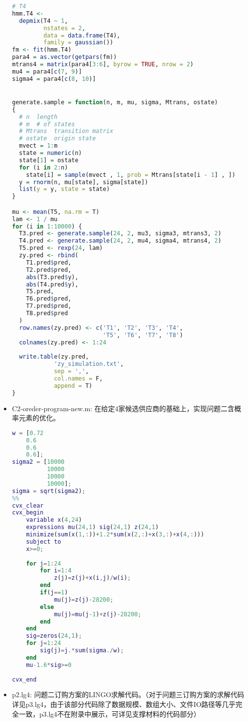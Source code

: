 \documentclass{my_paper}
\begin{document}
\begin{itemize}
\begin{lstlisting}[language=R]
# T4
hmm.T4 <-
  depmix(T4 ~ 1,
         nstates = 2,
         data = data.frame(T4),
         family = gaussian())
fm <- fit(hmm.T4)
para4 = as.vector(getpars(fm))
mtrans4 = matrix(para4[3:6], byrow = TRUE, nrow = 2)
mu4 = para4[c(7, 9)]
sigma4 = para4[c(8, 10)]


generate.sample = function(n, m, mu, sigma, Mtrans, ostate)
{
  # n  length
  # m  # of states
  # Mtrans  transition matrix
  # ostate  origin state
  mvect = 1:m
  state = numeric(n)
  state[1] = ostate
  for (i in 2:n)
    state[i] = sample(mvect , 1, prob = Mtrans[state[i - 1] , ])
  y = rnorm(n, mu[state], sigma[state])
  list(y = y, state = state)
}

mu <- mean(T5, na.rm = T)
lam <- 1 / mu
for (i in 1:10000) {
  T3.pred <- generate.sample(24, 2, mu3, sigma3, mtrans3, 2)
  T4.pred <- generate.sample(24, 2, mu4, sigma4, mtrans4, 2)
  T5.pred <- rexp(24, lam)
  zy.pred <- rbind(
    T1.pred$pred,
    T2.pred$pred,
    abs(T3.pred$y),
    abs(T4.pred$y),
    T5.pred,
    T6.pred$pred,
    T7.pred$pred,
    T8.pred$pred
  )
  row.names(zy.pred) <- c('T1', 'T2', 'T3', 'T4',
                          'T5', 'T6', 'T7', 'T8')
  colnames(zy.pred) <- 1:24
  
  write.table(zy.pred,
            'zy_simulation.txt',
            sep = ',',
            col.names = F,
            append = T)
}

\end{lstlisting}

\item C2-oreder-program-new.m: 在给定4家候选供应商的基础上，实现问题二含概率元素的优化。

\begin{lstlisting}[language={Matlab}]
w = [0.72
    0.6
    0.6 
    0.6];
sigma2 = [10000
          10000
          10000
          10000];
sigma = sqrt(sigma2);
%%
cvx_clear
cvx_begin
    variable x(4,24) 
    expressions mu(24,1) sig(24,1) z(24,1)
    minimize(sum(x(1,:))+1.2*sum(x(2,:)+x(3,:)+x(4,:)))
    subject to
    x>=0;
    
    for j=1:24
        for i=1:4
            z(j)=z(j)+x(i,j)/w(i);
        end
        if(j==1)
            mu(j)=z(j)-28200;
        else
            mu(j)=mu(j-1)+z(j)-28200;
        end
    end
    sig=zeros(24,1);
    for j=1:24
        sig(j)=j.*sum(sigma./w);
    end
    mu-1.6*sig>=0
    
cvx_end

\end{lstlisting}

\item p2.lg4: 问题二订购方案的LINGO求解代码。（对于问题三订购方案的求解代码详见p3.lg4，由于该部分代码除了数据规模、数组大小、文件IO路径等几乎完全一致，p3.lg4不在附录中展示，可详见支撑材料的代码部分）


\end{itemize}
\end{document}
